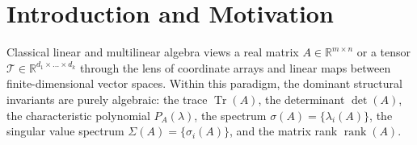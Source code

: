\documentclass[11pt,a4paper,reqno]{amsart}
\theoremstyle{definition}
\numberwithin{equation}{section}
\newcommand{\R}{\mathbb{R}}
\newcommand{\Tr}{\operatorname{Tr}}
\newcommand{\rank}{\operatorname{rank}}
\begin{document}

\maketitle

\tableofcontents

\newpage

\section{Introduction and Motivation}
\label{sec:intro}

Classical linear and multilinear algebra views a real matrix $A \in \R^{m \times n}$ or a tensor $\mathcal{T} \in \R^{d_1 \times \dots \times d_k}$ through the lens of coordinate arrays and linear maps between finite-dimensional vector spaces. Within this paradigm, the dominant structural invariants are purely algebraic: the trace $\Tr(A)$, the determinant $\det(A)$, the characteristic polynomial $P_A(\lambda)$, the spectrum $\sigma(A) = \{\lambda_i(A)\}$, the singular value spectrum $\Sigma(A) = \{\sigma_i(A)\}$, and the matrix rank $\rank(A)$.
\end{document}
